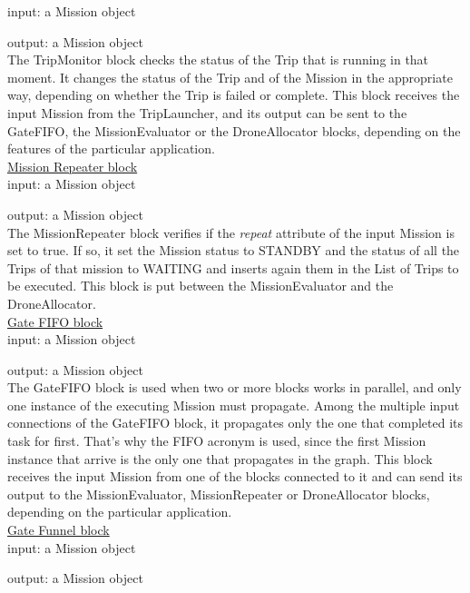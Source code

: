 input: a Mission object

output: a Mission object
\\

The TripMonitor block checks the status of the Trip that is running in that moment.
It changes the status of the Trip and of the Mission in the appropriate way, depending on whether the Trip is failed or complete.
This block receives the input Mission from the TripLauncher, and its output can be sent to the GateFIFO, the MissionEvaluator or the DroneAllocator blocks, depending on the features of the particular application.
\\



\underline{Mission Repeater block}
\\

input: a Mission object

output: a Mission object
\\

The MissionRepeater block verifies if the \textit{repeat} attribute of the input Mission is set to true.
If so, it set the Mission status to STANDBY and the status of all the Trips of that mission to WAITING and inserts again them in the List of Trips to be executed.
This block is put between the MissionEvaluator and the DroneAllocator.
\\

\underline{Gate FIFO block}
\\

input: a Mission object

output: a Mission object
\\

The GateFIFO block is used when two or more blocks works in parallel, and only one instance of the executing Mission must propagate.
Among the multiple input connections of the GateFIFO block, it propagates only the one that completed its task for first.
That's why the FIFO acronym is used, since the first Mission instance that arrive is the only one that propagates in the graph.
This block receives the input Mission from one of the blocks connected to it and can send its output to the MissionEvaluator, MissionRepeater or DroneAllocator blocks, depending on the particular application.
\\

\underline{Gate Funnel block}
\\

input: a Mission object

output: a Mission object
\\

